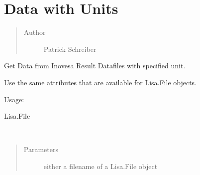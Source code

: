 \documentclass[letterpaper,10pt,openany,oneside,english]{sphinxmanual}
\begin{document}
\label{\detokenize{data:module-data}}

\chapter{Data with Units}
\label{\detokenize{data:data-with-units}}\label{\detokenize{data::doc}}\label{\detokenize{data:data}}\begin{quote}\begin{description}
\item[{Author}] \leavevmode
Patrick Schreiber

\end{description}\end{quote}

\begin{fulllineitems}
\label{\detokenize{data:data.Data}}
Get Data from Inovesa Result Datafiles with specified unit.

Use the same attributes that are available for Lisa.File objects.

Usage:

\begin{sphinxVerbatim}[commandchars=\\\{\}]
    
   
   
\end{sphinxVerbatim}




Lisa.File



\begin{fulllineitems}
\label{\detokenize{data:data.Data.__init__}}~\begin{quote}\begin{description}
\item[{Parameters}] \leavevmode
{} \textendash{} either a filename of a Lisa.File object


\end{description}
\end{quote}
\end{fulllineitems}
\end{fulllineitems}
\end{document}

